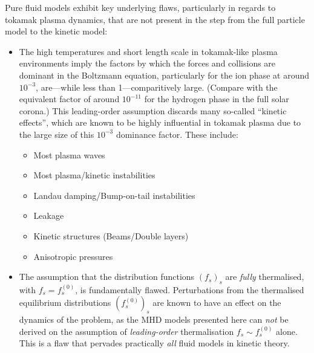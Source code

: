     Pure fluid models exhibit key underlying flaws, particularly in regards to tokamak plasma dynamics, that are not present in the step from the full particle model to the kinetic model:
    \begin{itemize}
        \item  The high temperatures and short length scale in tokamak-like plasma environments imply the factors by which the forces and collisions are dominant in the Boltzmann equation, particularly for the ion phase at around $10^{- 3}$, are—while less than 1—comparitively large. (Compare with the equivalent factor of around $10^{- 11}$ for the hydrogen phase in the full solar corona.) This leading-order assumption discards many so-called ``kinetic effects'', which are known to be highly influential in tokamak plasma due to the large size of this $10^{- 3}$ dominance factor. These include:
        \begin{itemize}
            \item  Most plasma waves \BA{[Ref]}
            \item  Most plasma/kinetic instabilities \BA{[Ref]}
            \item  Landau damping/Bump-on-tail instabilities \BA{[Ref]}
            \item  Leakage \BA{[Ref]}
            \item  Kinetic structures (Beams/Double layers) \BA{[Ref]}
            \item  Anisotropic pressures \BA{[Ref]}
        \end{itemize}
        \item  The assumption that the distribution functions $(f_{s})_{s}$ are \emph{fully} thermalised, with $f_{s}  =  f_{s}^{(0)}$, is fundamentally flawed. Perturbations from the thermalised equilibrium distributions $(f_{s}^{(0)})_{s}$ are known to have an effect on the dynamics of the problem, as the MHD models presented here can \emph{not} be derived on the assumption of \emph{leading-order} thermalisation $f_{s}  \sim  f_{s}^{(0)}$ alone. This is a flaw that pervades practically \emph{all} fluid models in kinetic theory.
    \end{itemize}
    